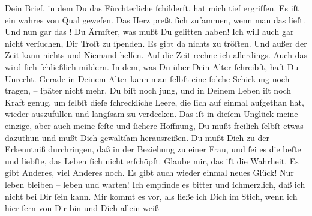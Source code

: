 {\begin{ledgroupsized}[t]{13cm}
           \pstart
           Dein Brief, in dem Du das Fürchterliche ſchilderſt, hat mich tief ergriſfen. Es iſt
               ein wahres \label{K_L02871-3v}\label{K_L02871-3h} von
               Qual geweſen. Das Herz preßt ſich zuſammen, wenn man das lieſt. Und nun gar das
                  \label{K_L02871-4v}\label{K_L02871-4h}! Du
               Ärmſter, was mußt Du gelitten haben! Ich will auch gar nicht verſuchen, Dir Troſt zu
               ſpenden. Es gibt  da nichts zu tröſten. Und außer der Zeit kann nichts und Niemand helfen. Auf
               die Zeit rechne ich allerdings. Auch das wird ſich ſchließlich mildern.  In dem, was Du über {\pb}Dein Alter ſchreibſt, haſt Du Unrecht. Gerade in
               Deinem Alter kann man ſelbſt eine ſolche Schickung noch tragen, – ſpäter nicht mehr.
               Du biſt noch jung, und in Deinem Leben iſt noch Kraft genug, um ſelbſt dieſe
               ſchreckliche Leere, die ſich auf einmal aufgethan hat, wieder auszufüllen und \strikeout{\textcolor{gray}{zu}\textcolor{gray}{×}} langſsam \introOben{}zu\introOben{} verdecken. Das iſt \strikeout{\textcolor{gray}{×}} in dieſem Unglück meine einzige, aber auch meine feſte und ſichere Hoffnung,
               Du mußt freilich ſelbſt etwas dazuthun und mußt Dich gewaltſam herausreißen. Du mußt
               Dich zu der Erkenntniß durchringen, daß in der Beziehung zu einer Frau, und ſei es
               die beſte und liebſte, das Leben ſich nicht erſchöpft. Glaube mir, das iſt die
               Wahrheit. Es gibt Anderes, viel Anderes noch. Es gibt auch wieder einmal neues Glück!
               Nur leben bleiben – leben und warten!\pend
           \pstart
           Ich empfinde es bitter und ſchmerzlich, daß ich nicht bei Dir ſein kann. Mir kommt es
               vor, als ließe ich Dich im Stich, wenn ich hier fern von Dir bin und Dich allein weiß

\end{ledgroupsized}}
